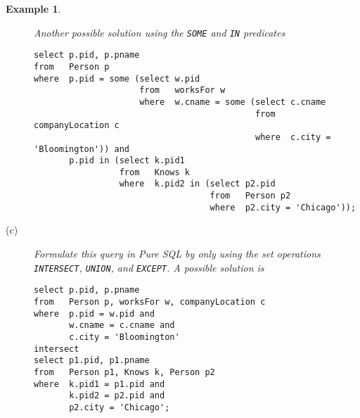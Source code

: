 \documentclass[11pt]{article}
\newtheorem{example}{Example}
\begin{document}
\begin{example}
\begin{description}
Another possible solution using the {\tt SOME} and {\tt IN} predicates
{\footnotesize
\begin{verbatim}
select p.pid, p.pname
from   Person p
where  p.pid = some (select w.pid
                     from   worksFor w
                     where  w.cname = some (select c.cname
                                            from   companyLocation c
                                            where  c.city = 'Bloomington')) and
       p.pid in (select k.pid1
                 from   Knows k
                 where  k.pid2 in (select p2.pid
                                   from   Person p2
                                   where  p2.city = 'Chicago'));
\end{verbatim}
}

\item[(c)]   Formulate this query in Pure SQL by only using the set operations {\tt INTERSECT}, {\tt UNION}, and {\tt EXCEPT}.
A possible solution is
{\footnotesize
\begin{verbatim}
select p.pid, p.pname
from   Person p, worksFor w, companyLocation c
where  p.pid = w.pid and
       w.cname = c.cname and
       c.city = 'Bloomington'
intersect
select p1.pid, p1.pname
from   Person p1, Knows k, Person p2
where  k.pid1 = p1.pid and
       k.pid2 = p2.pid and
       p2.city = 'Chicago';
\end{verbatim}}

\end{description}
\end{example}
\end{document}

